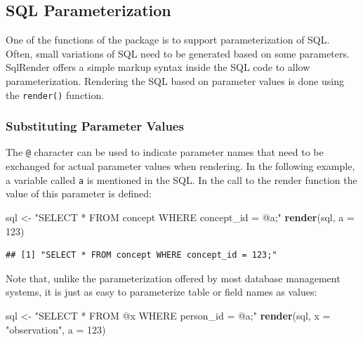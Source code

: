 \documentclass[11pt]{book}
\newenvironment{Shaded}{\begin{snugshade}}{\end{snugshade}}
\newcommand{\KeywordTok}[1]{\textcolor[rgb]{0.13,0.29,0.53}{\textbf{#1}}}
\newcommand{\DataTypeTok}[1]{\textcolor[rgb]{0.13,0.29,0.53}{#1}}
\newcommand{\DecValTok}[1]{\textcolor[rgb]{0.00,0.00,0.81}{#1}}
\newcommand{\StringTok}[1]{\textcolor[rgb]{0.31,0.60,0.02}{#1}}
\newcommand{\NormalTok}[1]{#1}
\theoremstyle{definition}
\theoremstyle{definition}
\theoremstyle{definition}
\theoremstyle{remark}
\begin{document}
\subsection{SQL Parameterization}\label{sql-parameterization}

One of the functions of the package is to support parameterization of
SQL. Often, small variations of SQL need to be generated based on some
parameters. SqlRender offers a simple markup syntax inside the SQL code
to allow parameterization. Rendering the SQL based on parameter values
is done using the \texttt{render()} function.

\subsubsection*{Substituting Parameter
Values}\label{substituting-parameter-values}

The \texttt{@} character can be used to indicate parameter names that
need to be exchanged for actual parameter values when rendering. In the
following example, a variable called \texttt{a} is mentioned in the SQL.
In the call to the render function the value of this parameter is
defined:

\begin{Shaded}
\begin{Highlighting}[]
\NormalTok{sql <-}\StringTok{ "SELECT * FROM concept WHERE concept_id = @a;"}
\KeywordTok{render}\NormalTok{(sql, }\DataTypeTok{a =} \DecValTok{123}\NormalTok{)}
\end{Highlighting}
\end{Shaded}

\begin{verbatim}
## [1] "SELECT * FROM concept WHERE concept_id = 123;"
\end{verbatim}

Note that, unlike the parameterization offered by most database
management systems, it is just as easy to parameterize table or field
names as values:

\begin{Shaded}
\begin{Highlighting}[]
\NormalTok{sql <-}\StringTok{ "SELECT * FROM @x WHERE person_id = @a;"}
\KeywordTok{render}\NormalTok{(sql, }\DataTypeTok{x =} \StringTok{"observation"}\NormalTok{, }\DataTypeTok{a =} \DecValTok{123}\NormalTok{)}
\end{Highlighting}
\end{Shaded}
\end{document}

